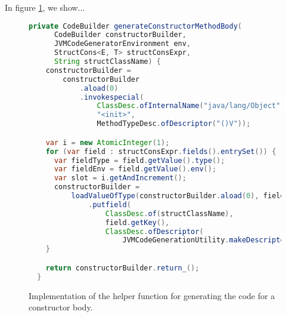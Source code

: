 In figure \ref{fig:jvm_constructor_builder}, we show...

\begin{figure}
    \centering
    \begin{lstlisting}[language=Java]
  private CodeBuilder generateConstructorMethodBody(
      CodeBuilder constructorBuilder,
      JVMCodeGeneratorEnvironment env,
      StructCons<E, T> structConsExpr,
      String structClassName) {
    constructorBuilder =
        constructorBuilder
            .aload(0)
            .invokespecial(
                ClassDesc.ofInternalName("java/lang/Object"),
                "<init>",
                MethodTypeDesc.ofDescriptor("()V"));

    var i = new AtomicInteger(1);
    for (var field : structConsExpr.fields().entrySet()) {
      var fieldType = field.getValue().type();
      var fieldEnv = field.getValue().env();
      var slot = i.getAndIncrement();
      constructorBuilder =
          loadValueOfType(constructorBuilder.aload(0), fieldEnv, fieldType, slot)
              .putfield(
                  ClassDesc.of(structClassName),
                  field.getKey(),
                  ClassDesc.ofDescriptor(
                      JVMCodeGenerationUtility.makeDescriptor(field.getValue().type(), env)));
    }

    return constructorBuilder.return_();
  }
    \end{lstlisting}
    \caption{Implementation of the helper function for generating the code for a constructor body.}
    \label{fig:jvm_constructor_builder}
\end{figure}
